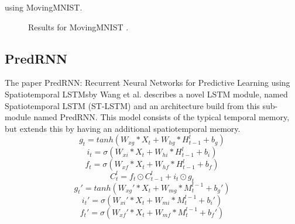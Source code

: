  using MovingMNIST.
 \begin{figure}[H]
   \centering
   \qquad
   \caption{Results for MovingMNIST \cite{Elsayed2018}.}
   \label{figure::elsayed_mnist}
  \end{figure}\noindent
 
 \subsection{PredRNN}
  The paper \glqq PredRNN: Recurrent Neural Networks for Predictive Learning using Spatiotemporal LSTMs\grqq by Wang et al. \cite{Wang2017} describes a novel
  LSTM module, named Spatiotemporal LSTM (ST-LSTM) and an architecture build from this sub-module named PredRNN.
  This model consists of the typical temporal memory, but extends this by having an additional spatiotemporal memory.
  \begin{equation}
   g_t = tanh(W_{xg} \ast X_t + W_{hg} \ast H_{t-1}^l + b_g)
  \end{equation}
  \begin{equation}
   i_t = \sigma(W_{xi} \ast X_t + W_{hi} \ast H_{t-1}^l +b_i)
  \end{equation}
  \begin{equation}
   f_t = \sigma(W_{xf} \ast X_t + W_{hf} \ast H_{t-1}^l + b_f)
  \end{equation}
  \begin{equation}
   C_t^l = f_t \odot C_{t-1}^l + i_t \odot g_t
  \end{equation}
  \begin{equation}
   g_t\prime = tanh(W_{xg}\prime \ast X_t + W_{mg} \ast M_t^{l-1} + b_g\prime)
  \end{equation}
  \begin{equation}
   i_t\prime = \sigma(W_{xi}\prime \ast X_t + W_{mi} \ast M_t^{l-1} + b_i\prime)
  \end{equation}
  \begin{equation}
   f_t\prime = \sigma(W_{xf}\prime \ast X_t + W_{mf} \ast M_t^{l-1} + b_f\prime)
  \end{equation}
